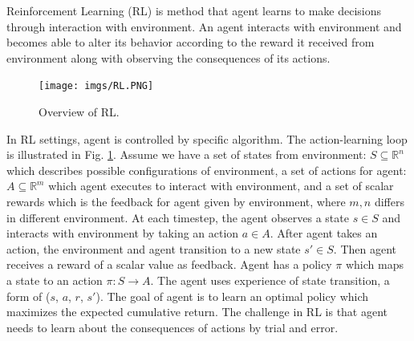 \documentclass[11pt,twocolumn]{jarticle} %
\begin{document}
Reinforcement Learning (RL) is method that agent learns to make decisions through interaction with environment. An agent interacts with environment and becomes able to alter its behavior according to the reward it received from environment along with observing the consequences of its actions. \par

\begin{figure}[h]
 \begin{center}
  \texttt{[image: imgs/RL.PNG]}
  \caption{
  Overview of RL.
  }
  \label{fig:rl}
 \end{center}
\end{figure}

In RL settings, agent is controlled by specific algorithm. The action-learning loop is illustrated in Fig. \ref{fig:rl}. Assume we have a set of states from environment: $S \subseteq \mathbb{R}^n$ which describes possible configurations of environment, a set of actions for agent: $A \subseteq \mathbb{R}^m$ which agent executes to interact with environment, and a set of scalar rewards which is the feedback for agent given by environment, where $m, n$ differs in different environment. At each timestep, the agent observes a state $s \in S$ and interacts with environment by taking an action $a \in A$. After agent takes an action, the environment and agent transition to a new state $s' \in S$. Then agent receives a reward of a scalar value as feedback. Agent has a policy $\pi$ which maps a state to an action $\pi: S \rightarrow A$. The agent uses experience of state transition, a form of ($s$, $a$, $r$, $s'$). The goal of agent is to learn an optimal policy which maximizes the expected cumulative return. The challenge in RL is that agent needs to learn about the consequences of actions by trial and error. \par
\end{document}
